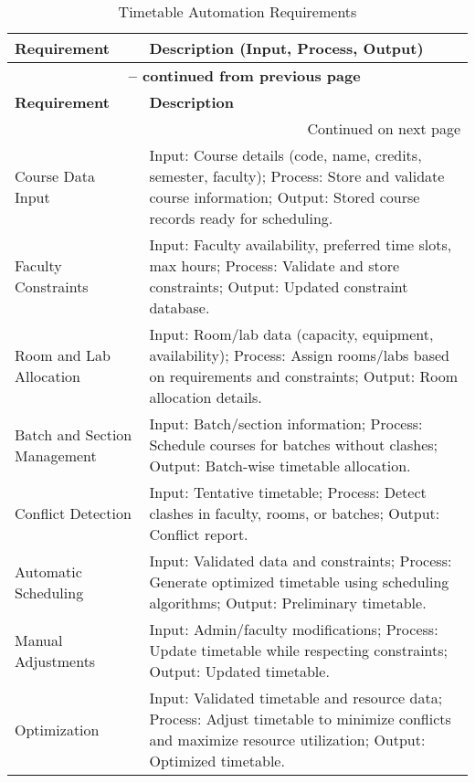 \documentclass[12pt]{article}
\begin{document}
\begin{longtable}{|p{4cm}|p{11cm}|} 
\caption{Timetable Automation Requirements} \\ 
\hline 
\textbf{Requirement} & \textbf{Description (Input, Process, Output)} \\ 
\hline 
\endfirsthead 
\multicolumn{2}{c}{{\bfseries \tablename\ \thetable{} -- continued from previous page}} \\ 
\hline 
\textbf{Requirement} & \textbf{Description} \\ 
\hline 
\endhead 
\hline 
\multicolumn{2}{r}{{Continued on next page}} \\ 
\endfoot 
\hline 
\endlastfoot 

Course Data Input & Input: Course details (code, name, credits, semester, faculty); Process: Store and validate course information; Output: Stored course records ready for scheduling. \\ 
\hline 

Faculty Constraints & Input: Faculty availability, preferred time slots, max hours; Process: Validate and store constraints; Output: Updated constraint database. \\ 
\hline 

Room and Lab Allocation & Input: Room/lab data (capacity, equipment, availability); Process: Assign rooms/labs based on requirements and constraints; Output: Room allocation details. \\ 
\hline 

Batch and Section Management & Input: Batch/section information; Process: Schedule courses for batches without clashes; Output: Batch-wise timetable allocation. \\ 
\hline 

Conflict Detection & Input: Tentative timetable; Process: Detect clashes in faculty, rooms, or batches; Output: Conflict report. \\ 
\hline 

Automatic Scheduling & Input: Validated data and constraints; Process: Generate optimized timetable using scheduling algorithms; Output: Preliminary timetable. \\ 
\hline 

Manual Adjustments & Input: Admin/faculty modifications; Process: Update timetable while respecting constraints; Output: Updated timetable. \\ 
\hline 

Optimization & Input: Validated timetable and resource data; Process: Adjust timetable to minimize conflicts and maximize resource utilization; Output: Optimized timetable. \\ 
\hline 


\end{longtable}
\end{document}
